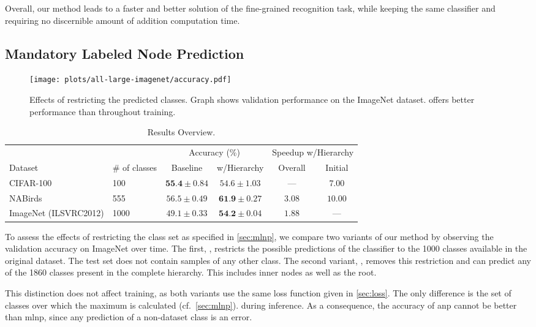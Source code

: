 \documentclass[10pt,twocolumn,letterpaper]{article}
\begin{document}
Overall, our method leads to a faster and better solution of the fine-grained recognition task,
while keeping the same classifier and requiring no discernible amount of addition computation time.

\subsection{Mandatory Labeled Node Prediction}
\label{sec:expmlnp}
\begin{figure}
\centering
\texttt{[image: plots/all-large-imagenet/accuracy.pdf]}
\caption{Effects of restricting the predicted classes. Graph shows validation performance on the ImageNet dataset.
   offers better performance than  throughout training.}
\label{fig:expmlnpgraph}
\end{figure}
\begin{table*}[t]
\centering
\caption{Results Overview.}
\label{tbl:expoverview}
\begin{tabular}{l|l||c|c||c|c}
 &  & \multicolumn{2}{c||}{Accuracy (\%)} & \multicolumn{2}{c}{Speedup w/Hierarchy}\\
Dataset       &  \# of classes  &     Baseline     &       w/Hierarchy        & Overall & Initial \\\hline
CIFAR-100     &  100     & $\textbf{55.4} \pm 0.84$ &  $54.6 \pm 1.03$ & ---            &  $7.00$\\
NABirds       &  555     & $56.5 \pm 0.49$ &  $\textbf{61.9} \pm 0.27$ & $3.08$ &  $10.00$\\
ImageNet (ILSVRC2012)  &  1000    & $49.1 \pm 0.33$  & $\textbf{54.2} \pm 0.04$ & $1.88$ & ---
\end{tabular} 
\end{table*}

To assess the effects of restricting the class set as specified in \cref{sec:mlnp}, we compare two variants
of our method by observing
the validation accuracy on ImageNet over time. The first, , restricts the possible
predictions of the classifier to the 1000 classes available in the original dataset. The test set does
not contain samples of any other class. The second variant, , removes this restriction and
can predict any of the 1860 classes present in the complete hierarchy. This includes inner nodes as
well as the root.

This distinction does not affect training, as both variants use the same loss function given in
\cref{sec:loss}. The only difference is the set of classes over which the maximum is calculated (cf.~\cref{sec:mlnp}).
during inference. As a consequence, the accuracy of \gls{anp} cannot be better
than \gls{mlnp}, since any prediction of a non-dataset class is an error.
\end{document}
